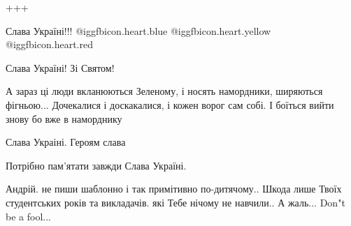 \begin{itemize}
+++

Слава Україні!!! @igg{fbicon.heart.blue}  @igg{fbicon.heart.yellow} @igg{fbicon.heart.red}

Слава Україні! Зі Святом!


А зараз ці люди вкланюються Зеленому, і носять намордники, ширяються фігньою...
Дочекалися і доскакалися, і кожен ворог сам собі. І боїться вийти знову бо вже
в наморднику


Слава Украіні. Героям слава

Потрібно пам'ятати завжди Слава Україні.


Андрій. не пиши шаблонно і так примітивно по-дитячому.. Шкода лише Твоїх
студентських років та викладачів. які Тебе нічому не навчили.. А жаль... Don"t be
a fool...


\end{itemize} %
